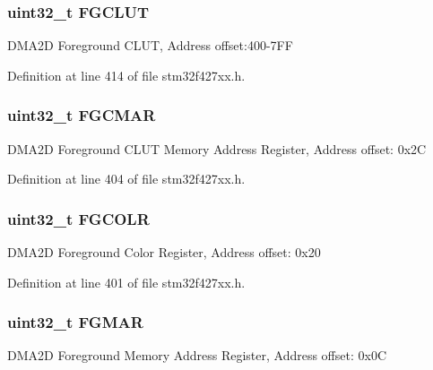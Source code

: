 \subsubsection[{\texorpdfstring{F\+G\+C\+L\+UT}{FGCLUT}}]{ uint32\+\_\+t F\+G\+C\+L\+UT}\hypertarget{struct_d_m_a2_d___type_def_aa263c42ff3097bde6c0d4061ac0d8e43}{}\label{struct_d_m_a2_d___type_def_aa263c42ff3097bde6c0d4061ac0d8e43}
D\+M\+A2D Foreground C\+L\+UT, Address offset\+:400-\/7\+FF 

Definition at line 414 of file stm32f427xx.\+h.

\subsubsection[{\texorpdfstring{F\+G\+C\+M\+AR}{FGCMAR}}]{ uint32\+\_\+t F\+G\+C\+M\+AR}\hypertarget{struct_d_m_a2_d___type_def_a27ad59cf99d0d0904958175238c40d8d}{}\label{struct_d_m_a2_d___type_def_a27ad59cf99d0d0904958175238c40d8d}
D\+M\+A2D Foreground C\+L\+UT Memory Address Register, Address offset\+: 0x2C 

Definition at line 404 of file stm32f427xx.\+h.

\subsubsection[{\texorpdfstring{F\+G\+C\+O\+LR}{FGCOLR}}]{ uint32\+\_\+t F\+G\+C\+O\+LR}\hypertarget{struct_d_m_a2_d___type_def_a3b7bcbbdcd4f728861babc3300a26f61}{}\label{struct_d_m_a2_d___type_def_a3b7bcbbdcd4f728861babc3300a26f61}
D\+M\+A2D Foreground Color Register, Address offset\+: 0x20 

Definition at line 401 of file stm32f427xx.\+h.

\subsubsection[{\texorpdfstring{F\+G\+M\+AR}{FGMAR}}]{ uint32\+\_\+t F\+G\+M\+AR}\hypertarget{struct_d_m_a2_d___type_def_a17e8aa3d2c6464eba518c8ccf28c173d}{}\label{struct_d_m_a2_d___type_def_a17e8aa3d2c6464eba518c8ccf28c173d}
D\+M\+A2D Foreground Memory Address Register, Address offset\+: 0x0C 


